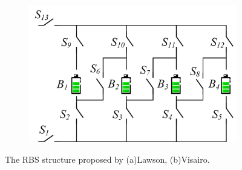 \documentclass{article}
\begin{document}
\begin{figure}[htbp]
\begin{subfigure}[b]{0.2\textwidth}
        \caption{}
        \label{fig:arch-f}
    \end{subfigure}
    \hspace{0.05\textwidth}
    \begin{subfigure}[b]{0.45\textwidth}
        \includegraphics[width=\textwidth]{../attachments/arch-f.png}
        \caption{}
        \label{fig:arch-e}
    \end{subfigure}
    \caption{The RBS structure proposed by (a)Lawson\cite{lawsonSoftwareConfigurableBattery2012}, (b)Visairo\cite{visairoReconfigurableBatteryPack2008}.}
    \label{fig:arch}
\end{figure}
\end{document}
